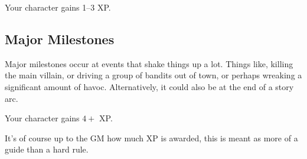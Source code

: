 Your character gains 1--3 XP.

\subsection{Major Milestones}
Major milestones occur at events that shake things up a lot.
Things like, killing the main villain, or driving a group of bandits out of town, or perhaps wreaking a significant amount of havoc.
Alternatively, it could also be at the end of a story arc.

Your character gains $4+$ XP.

\begin{note} 
  It's of course up to the GM how much XP is awarded, this is meant as more of a guide than a hard rule.
\end{note}
